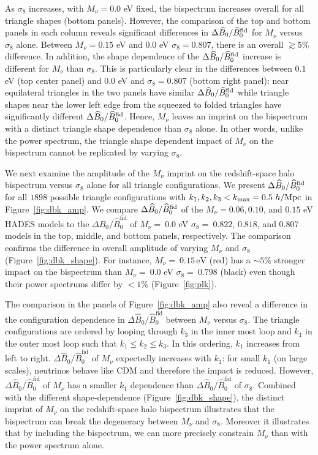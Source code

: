 \documentclass[12pt, letterpaper, preprint]{aastex62}
\newcommand{\smnu}{M_\nu}
\newcommand{\sig}{\sigma_8}
\newcommand{\BOk}{\widehat{B}_0}
\begin{document}
As $\sig$ increases, with $\smnu = 0.0$ eV fixed, the bispectrum increases 
overall for all triangle shapes (bottom panels). However, the comparison of the
top and bottom panels in each column reveals significant differences in 
$\Delta \BOk/\BOk^{\rm fid}$ for $\smnu$ versus $\sig$ alone. Between 
$\smnu=0.15$ eV and $0.0$ eV $\sig = 0.807$, there is an overall $\gtrsim 5\%$ 
difference. In addition, the shape dependence of the $\Delta \BOk/\BOk^{\rm fid}$ 
increase is different for $\smnu$ than $\sig$. This is particularly clear in 
the differences between $0.1$ eV (top center panel) and 0.0 eV and $\sig=0.807$ 
(bottom right panel): near equilateral triangles in the two panels have similar 
$\Delta \BOk/\BOk^{\rm fid}$ while triangle shapes near the lower left edge from 
the squeezed to folded triangles have significantly different $\Delta \BOk/\BOk^{\rm fid}$. 
Hence, $\smnu$ leaves an imprint on the bispectrum with a distinct triangle 
shape dependence than $\sig$ alone. In other words, unlike the power spectrum, 
the triangle shape dependent impact of $\smnu$ on the bispectrum cannot be 
replicated by varying $\sig$. 

We next examine the amplitude of the $\smnu$ imprint on the redshift-space halo 
bispectrum versus $\sig$ alone for all triangle configurations. We present 
$\Delta \BOk/\BOk^{\rm fid}$ for all $1898$ possible triangle configurations 
with $k_1, k_2, k_3 < k_{\rm max} = 0.5~h/{\rm Mpc}$ in Figure~\ref{fig:dbk_amp}. 
We compare $\Delta \BOk/\BOk^{\rm fid}$ of the $\smnu = 0.06, 0.10$, and 
$0.15$ eV HADES models to the $\Delta \BOk/\BOk^\mathrm{fid}$ of 
$\smnu{=}~0.0$ eV $\sig{=}~0.822$, $0.818$, and $0.807$ models in the
top, middle, and bottom panels, respectively. The comparison confirms the 
difference in overall amplitude of varying $\smnu$ and $\sig$ (Figure~\ref{fig:dbk_shape}). 
For instance, $\smnu{=}~0.15\,\mathrm{eV}$ (red) has a $\sim 5\%$ stronger 
impact on the bispectrum than $\smnu{=}~0.0$ eV $\sig{=}~0.798$ (black) 
even though their power spectrums differ by $< 1\%$ (Figure~\ref{fig:plk}).

The comparison in the panels of Figure~\ref{fig:dbk_amp} also reveal a difference 
in the configuration dependence in $\Delta \BOk/\BOk^\mathrm{fid}$ between $\smnu$ 
versus $\sig$. The triangle configurations are ordered by looping through $k_3$ 
in the inner most loop and $k_1$ in the outer most loop such that $k_1 \leq k_2 \leq k_3$. 
In this ordering, $k_1$ increases from left to right. $\Delta \BOk/\BOk^\mathrm{fid}$ 
of $\smnu$ expectedly increases with $k_1$: for small $k_1$ (on large scales), 
neutrinos behave like CDM and therefore the impact is reduced. However, 
$\Delta \BOk/\BOk^\mathrm{fid}$ of $\smnu$ has a smaller $k_1$ dependence than 
$\Delta \BOk/\BOk^\mathrm{fid}$ of $\sig$. Combined with the different shape-dependence
(Figure~\ref{fig:dbk_shape}), the distinct imprint of $\smnu$ on the redshift-space 
halo bispectrum illustrates that the bispectrum can break the degeneracy between 
$\smnu$ and $\sig$. Moreover it illustrates that by including the bispectrum, we 
can more precisely constrain $\smnu$ than with the power spectrum alone. 
\end{document}
